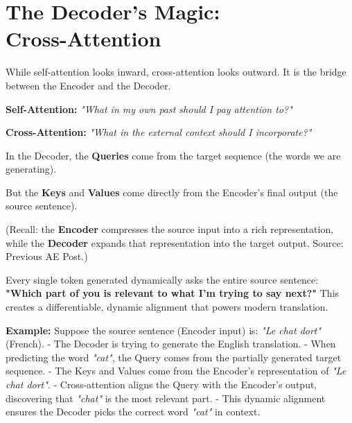 \documentclass[11pt]{article}
\begin{document}
\vfill
\newpage


\section*{The Decoder's Magic:\\Cross-Attention}

\vspace{0.1in}

While self-attention looks inward, cross-attention looks outward. It is the bridge between the Encoder and the Decoder. 

\vspace{0.15in}

\begin{darkbox}
\textbf{Self-Attention:} \textit{"What in my own past should I pay attention to?"}

\vspace{0.05in}
\textbf{Cross-Attention:} \textit{"What in the external context should I incorporate?"}
\end{darkbox}

\vspace{0.15in}

In the Decoder, the \textbf{Queries} come from the target sequence (the words we are generating).

But the \textbf{Keys} and \textbf{Values} come directly from the Encoder's final output (the source sentence). 

{\small (Recall: the \textbf{Encoder} compresses the source input into a rich representation, while the \textbf{Decoder} expands that representation into the target output. Source: Previous AE Post.)}

\vspace{0.15in}

Every single token generated dynamically asks the entire source sentence: \textbf{"Which part of you is relevant to what I'm trying to say next?"} This creates a differentiable, dynamic alignment that powers modern translation.

\vspace{0.15in}

\textbf{Example:}  
Suppose the source sentence (Encoder input) is: \textit{"Le chat dort"} (French).  
- The Decoder is trying to generate the English translation.  
- When predicting the word \textit{"cat"}, the Query comes from the partially generated target sequence.  
- The Keys and Values come from the Encoder’s representation of \textit{"Le chat dort"}.  
- Cross-attention aligns the Query with the Encoder’s output, discovering that \textit{"chat"} is the most relevant part.  
- This dynamic alignment ensures the Decoder picks the correct word \textit{"cat"} in context.
\end{document}
